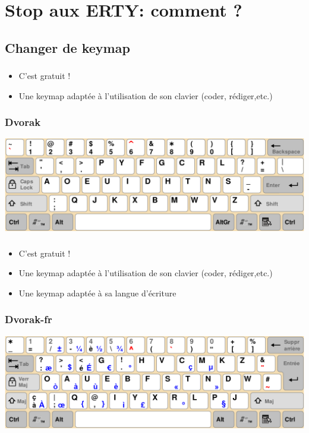 \documentclass[c,12pt]{beamer}
\begin{document}
\section{Stop aux ERTY: comment ?}
\subsection{Changer de keymap}

\begin{frame}
	\frametitle{\subsecname}
	\begin{itemize}
		\item{C'est gratuit !}
		\item<2->{Une keymap adaptée à l'utilisation de son clavier (coder,
			rédiger,etc.)}
	\end{itemize}
\end{frame}

\begin{frame}
	\frametitle{Dvorak}
	\begin{center}
		\includegraphics[scale=0.26]{Dvorak.png}
	\end{center}
\end{frame}

\begin{frame}
	\frametitle{\subsecname}
	\begin{itemize}
		\item<1->{C'est gratuit !}
		\item<1->{Une keymap adaptée à l'utilisation de son clavier (coder,
			rédiger,etc.)}
		\item<2->{Une keymap adaptée à sa langue d'écriture}
	\end{itemize}
\end{frame}

\begin{frame}
	\frametitle{Dvorak-fr}
	\begin{center}
		\includegraphics[scale=0.26]{Dvorak-fr.png}
	\end{center}
\end{frame}
\end{document}
